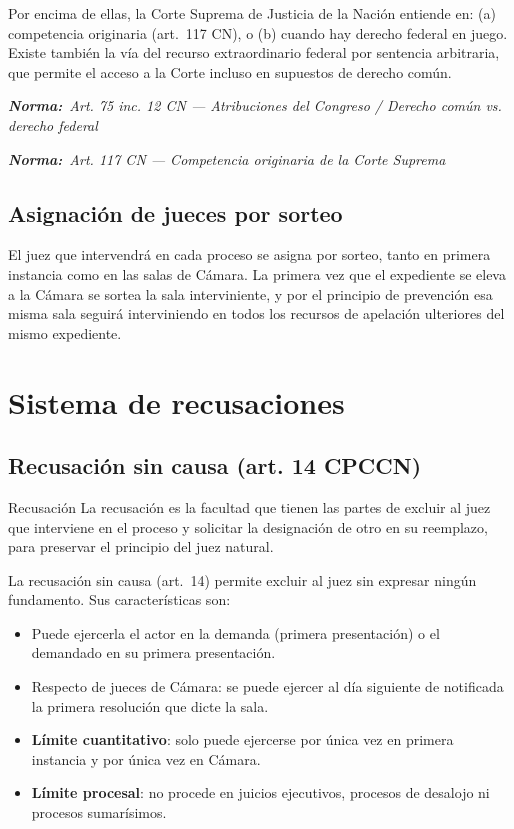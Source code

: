 \documentclass[12pt,oneside]{book}
\newcommand{\normaref}[1]{%
    \par\noindent\textbf{\textit{Norma:}}~\textit{#1}\par\vspace{0.2em}
}
\begin{document}
Por encima de ellas, la Corte Suprema de Justicia de la Nación entiende en: (a) competencia originaria (art.\ 117 CN), o (b) cuando hay derecho federal en juego. Existe también la vía del recurso extraordinario federal por sentencia arbitraria, que permite el acceso a la Corte incluso en supuestos de derecho común.

\normaref{Art. 75 inc. 12 CN --- Atribuciones del Congreso / Derecho común vs. derecho federal}
\normaref{Art. 117 CN --- Competencia originaria de la Corte Suprema}

\subsection{Asignación de jueces por sorteo}

El juez que intervendrá en cada proceso se asigna por sorteo, tanto en primera instancia como en las salas de Cámara. La primera vez que el expediente se eleva a la Cámara se sortea la sala interviniente, y por el principio de prevención esa misma sala seguirá interviniendo en todos los recursos de apelación ulteriores del mismo expediente.

\section{Sistema de recusaciones}

\subsection{Recusación sin causa (art. 14 CPCCN)}

\begin{definition}{Recusación}
La recusación es la facultad que tienen las partes de excluir al juez que interviene en el proceso y solicitar la designación de otro en su reemplazo, para preservar el principio del juez natural.
\end{definition}

La recusación sin causa (art.\ 14) permite excluir al juez sin expresar ningún fundamento. Sus características son:

\begin{itemize}
    \item Puede ejercerla el actor en la demanda (primera presentación) o el demandado en su primera presentación.
    \item Respecto de jueces de Cámara: se puede ejercer al día siguiente de notificada la primera resolución que dicte la sala.
    \item \textbf{Límite cuantitativo}: solo puede ejercerse por única vez en primera instancia y por única vez en Cámara.
    \item \textbf{Límite procesal}: no procede en juicios ejecutivos, procesos de desalojo ni procesos sumarísimos.
\end{itemize}
\end{document}
